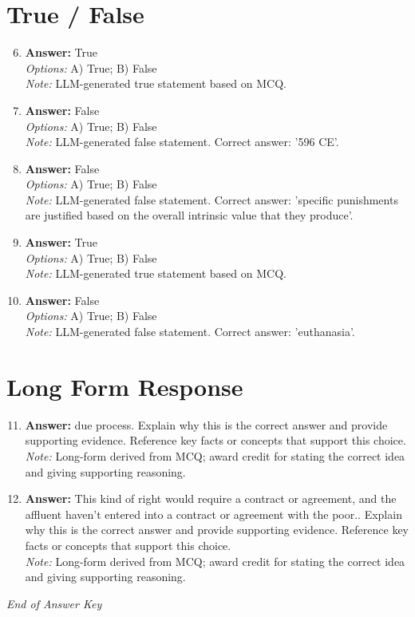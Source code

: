 \documentclass[12pt]{article}
\begin{document}
\section*{True / False}
\begin{enumerate}[label=\arabic*.]
\setcounter{enumi}{5}
\item \textbf{Answer:} True
\\ \textit{Options:} A) True; B) False
\\ \textit{Note:} LLM-generated true statement based on MCQ.
\item \textbf{Answer:} False
\\ \textit{Options:} A) True; B) False
\\ \textit{Note:} LLM-generated false statement. Correct answer: '596 CE'.
\item \textbf{Answer:} False
\\ \textit{Options:} A) True; B) False
\\ \textit{Note:} LLM-generated false statement. Correct answer: 'specific punishments are justified based on the overall intrinsic value that they produce'.
\item \textbf{Answer:} True
\\ \textit{Options:} A) True; B) False
\\ \textit{Note:} LLM-generated true statement based on MCQ.
\item \textbf{Answer:} False
\\ \textit{Options:} A) True; B) False
\\ \textit{Note:} LLM-generated false statement. Correct answer: 'euthanasia'.
\end{enumerate}

\section*{Long Form Response}
\begin{enumerate}[label=\arabic*.]
\setcounter{enumi}{10}
\item \textbf{Answer:} due process. Explain why this is the correct answer and provide supporting evidence. Reference key facts or concepts that support this choice.
\\ \textit{Note:} Long-form derived from MCQ; award credit for stating the correct idea and giving supporting reasoning.
\item \textbf{Answer:} This kind of right would require a contract or agreement, and the affluent haven't entered into a contract or agreement with the poor.. Explain why this is the correct answer and provide supporting evidence. Reference key facts or concepts that support this choice.
\\ \textit{Note:} Long-form derived from MCQ; award credit for stating the correct idea and giving supporting reasoning.
\end{enumerate}

\vfill
\noindent\textit{End of Answer Key}
\end{document}
